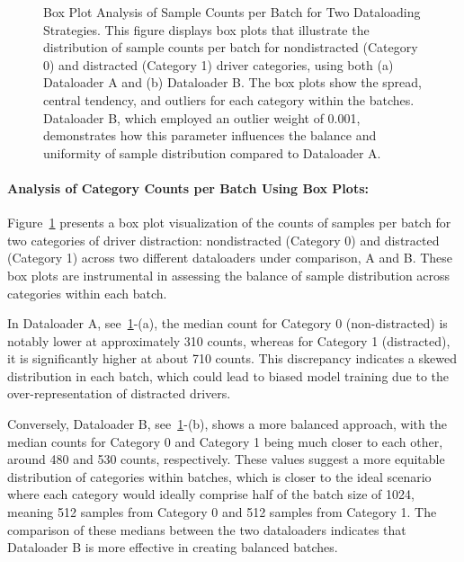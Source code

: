 \begin{figure}[htbp]
    \caption[Box plot analysis of sample counts per batch for dataloading strategies.]{Box Plot Analysis of Sample Counts per Batch for Two Dataloading Strategies. This figure displays box plots that illustrate the distribution of sample counts per batch for nondistracted (Category 0) and distracted (Category 1) driver categories, using both (a) Dataloader A and (b) Dataloader B. The box plots show the spread, central tendency, and outliers for each category within the batches. Dataloader B, which employed an outlier weight of 0.001, demonstrates how this parameter influences the balance and uniformity of sample distribution compared to Dataloader A.}
    \label{fig:Box plot dataloader A and dataloader B with 0_001}
\end{figure}

\paragraph{Analysis of Category Counts per Batch Using Box Plots:}
Figure~\ref{fig:Box plot dataloader A and dataloader B with 0_001} presents a box plot visualization of the counts of samples per batch for two categories of driver distraction: nondistracted (Category 0) and distracted (Category 1) across two different dataloaders under comparison, A and B. These box plots are instrumental in assessing the balance of sample distribution across categories within each batch.

In Dataloader A, see~\ref{fig:Box plot dataloader A and dataloader B with 0_001}-(a), the median count for Category 0 (non-distracted) is notably lower at approximately 310 counts, whereas for Category 1 (distracted), it is significantly higher at about 710 counts. This discrepancy indicates a skewed distribution in each batch, which could lead to biased model training due to the over-representation of distracted drivers.

Conversely, Dataloader B, see~\ref{fig:Box plot dataloader A and dataloader B with 0_001}-(b), shows a more balanced approach, with the median counts for Category 0 and Category 1 being much closer to each other, around 480 and 530 counts, respectively. These values suggest a more equitable distribution of categories within batches, which is closer to the ideal scenario where each category would ideally comprise half of the batch size of 1024, meaning 512 samples from Category 0 and 512 samples from Category 1. The comparison of these medians between the two dataloaders indicates that Dataloader B is more effective in creating balanced batches.

